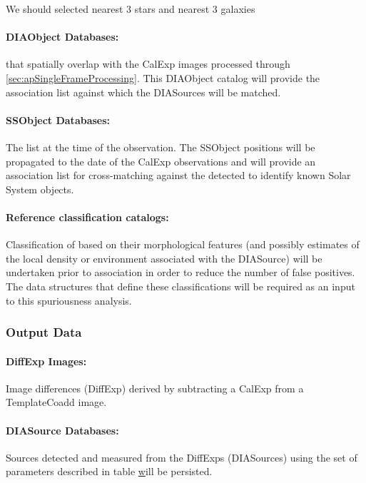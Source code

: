 \begin{note} We should selected nearest 3 stars and nearest 3 galaxies \end{note}

\paragraph*{DIAObject Databases:} \DIAObjects that spatially overlap with the CalExp images processed through \ref{sec:apSingleFrameProcessing}. This DIAObject catalog will provide the association  list against which the DIASources will be matched. 

\paragraph*{SSObject Databases:} The \SSObject list at the time of the observation. The SSObject positions will be propagated to the date of the CalExp observations and will provide an association  list for cross-matching against the detected \DIASources to identify known Solar System objects.

\paragraph*{Reference classification catalogs:} Classification of \DIASources based on their morphological features (and possibly estimates of the local density or  environment associated with the DIASource) will be undertaken prior to association in order to reduce the number of false positives. The data structures that define these classifications will be required as an input to this spuriousness analysis. 



\subsubsection{Output Data}
\label{sec:apADOutput}

\paragraph*{DiffExp Images:} Image differences (DiffExp) derived by subtracting a CalExp from a TemplateCoadd image.

\paragraph*{DIASource Databases:} Sources detected and measured from the DiffExps (DIASources) using the set of parameters described in table \hyperref[table:ap_features] will be persisted.


